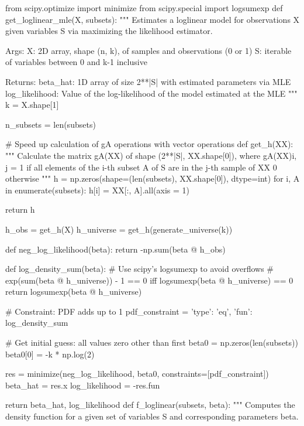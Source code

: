 \begin{python}
from scipy.optimize import minimize
from scipy.special import logsumexp
def get_loglinear_mle(X, subsets):
    """
    Estimates a loglinear model for observations X given variables S 
    via maximizing the likelihood estimator.
    
    Args:
       X:  2D array, shape (n, k), of samples and observations (0 or 1)
       S:  iterable of variables between 0 and k-1 inclusive
       
    Returns:
       beta_hat:  1D array of size 2**|S| with estimated parameters via MLE
       log_likelihood:  Value of the log-likelihood of the model estimated at the MLE
    """
    k = X.shape[1]
    
    n_subsets = len(subsets)
    
    # Speed up calculation of gA operations with vector operations
    def get_h(XX):
        """
        Calculate the matrix gA(XX) of shape (2**|S|, XX.shape[0]), where
        gA(XX){i, j} = 1 if all elements of the i-th subset A of S 
                         are in the j-th sample of XX
                       0 otherwise
        """
        h = np.zeros(shape=(len(subsets), XX.shape[0]), dtype=int)
        for i, A in enumerate(subsets):
            h[i] = XX[:, A].all(axis = 1)
            
        return h
    
    h_obs = get_h(X)
    h_universe = get_h(generate_universe(k))
    
    def neg_log_likelihood(beta):
        return -np.sum(beta @ h_obs)
    
    def log_density_sum(beta):
        # Use scipy's logsumexp to avoid overflows
        # exp(sum(beta @ h_universe)) - 1 == 0 iff logsumexp(beta @ h_universe) == 0
        return logsumexp(beta @ h_universe)
    
    # Constraint: PDF adds up to 1
    pdf_constraint = {'type': 'eq', 'fun': log_density_sum}
    
    # Get initial guess: all values zero other than first
    beta0 = np.zeros(len(subsets))
    beta0[0] = -k * np.log(2)
    
    res = minimize(neg_log_likelihood, beta0, constraints=[pdf_constraint])
    beta_hat = res.x
    log_likelihood = -res.fun
    
    return beta_hat, log_likelihood
def f_loglinear(subsets, beta):
    """
    Computes the density function for a given set of variables S 
    and corresponding parameters beta.
    

\end{python}
